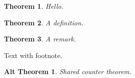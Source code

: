 \documentclass{article}
\newtheorem{theorem}{Theorem}
\newenvironment{mydefn}{\begin{theorem}}{\end{theorem}}
\newenvironment{myremark}{\begin{theorem}}{\end{theorem}}
\newcounter{altctr}
\newtheorem{altthm}[altctr]{Alt Theorem}
\begin{document}
\begin{theorem}
Hello.
\end{theorem}

\begin{mydefn}
A definition.
\end{mydefn}

\begin{myremark}
A remark.
\end{myremark}

Text with footnote.

\begin{altthm}
Shared counter theorem.
\end{altthm}
\end{document}
